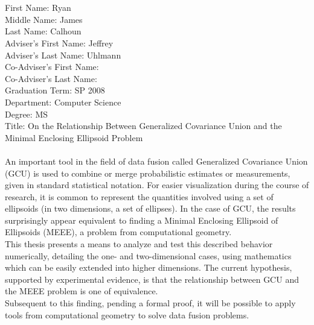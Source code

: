 \documentclass[12pt,letterpaper]{report}
\begin{document}
\thispagestyle{empty}

\\
\\
First Name: Ryan\\
Middle Name: James\\
Last Name: Calhoun\\
Adviser's First Name: Jeffrey\\
Adviser's Last Name: Uhlmann\\
Co-Adviser's First Name:\\
Co-Adviser's Last Name:\\
Graduation Term: SP 2008\\
Department: Computer Science\\
Degree: MS\\
Title: On the Relationship Between Generalized Covariance Union and the Minimal Enclosing Ellipsoid
Problem
\\
\\
\indent An important tool in the field of data fusion called Generalized Covariance Union (GCU) is used to combine
or merge probabilistic estimates or measurements, given in standard statistical notation. For easier
visualization during the course of research, it is common to represent the quantities involved using a set of
ellipsoids (in two dimensions, a set of ellipses). In the case of GCU, the results surprisingly appear
equivalent to finding a Minimal Enclosing Ellipsoid of Ellipsoids (MEEE), a problem from computational
geometry.
\\
\indent This thesis presents a means to analyze and test this described behavior numerically, detailing the one-
and two-dimensional cases, using mathematics which can be easily extended into higher dimensions. The
current hypothesis, supported by experimental evidence, is that the relationship between GCU and the
MEEE problem is one of equivalence.
\\
\indent Subsequent to this finding, pending a formal proof, it will be possible
to apply tools from computational geometry to solve data fusion problems.


\thispagestyle{empty}
\end{document}
